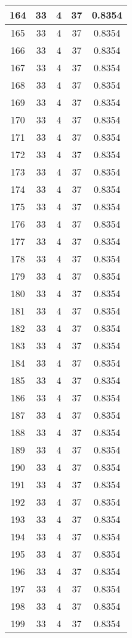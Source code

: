\documentclass[letterpaper, 12pt]{article}
\begin{document}
\begin{longtable}{|c|c|c|c|c|}
\hline
164 & 33 & 4 & 37 & 0.8354 \\
\hline
165 & 33 & 4 & 37 & 0.8354 \\
\hline
166 & 33 & 4 & 37 & 0.8354 \\
\hline
167 & 33 & 4 & 37 & 0.8354 \\
\hline
168 & 33 & 4 & 37 & 0.8354 \\
\hline
169 & 33 & 4 & 37 & 0.8354 \\
\hline
170 & 33 & 4 & 37 & 0.8354 \\
\hline
171 & 33 & 4 & 37 & 0.8354 \\
\hline
172 & 33 & 4 & 37 & 0.8354 \\
\hline
173 & 33 & 4 & 37 & 0.8354 \\
\hline
174 & 33 & 4 & 37 & 0.8354 \\
\hline
175 & 33 & 4 & 37 & 0.8354 \\
\hline
176 & 33 & 4 & 37 & 0.8354 \\
\hline
177 & 33 & 4 & 37 & 0.8354 \\
\hline
178 & 33 & 4 & 37 & 0.8354 \\
\hline
179 & 33 & 4 & 37 & 0.8354 \\
\hline
180 & 33 & 4 & 37 & 0.8354 \\
\hline
181 & 33 & 4 & 37 & 0.8354 \\
\hline
182 & 33 & 4 & 37 & 0.8354 \\
\hline
183 & 33 & 4 & 37 & 0.8354 \\
\hline
184 & 33 & 4 & 37 & 0.8354 \\
\hline
185 & 33 & 4 & 37 & 0.8354 \\
\hline
186 & 33 & 4 & 37 & 0.8354 \\
\hline
187 & 33 & 4 & 37 & 0.8354 \\
\hline
188 & 33 & 4 & 37 & 0.8354 \\
\hline
189 & 33 & 4 & 37 & 0.8354 \\
\hline
190 & 33 & 4 & 37 & 0.8354 \\
\hline
191 & 33 & 4 & 37 & 0.8354 \\
\hline
192 & 33 & 4 & 37 & 0.8354 \\
\hline
193 & 33 & 4 & 37 & 0.8354 \\
\hline
194 & 33 & 4 & 37 & 0.8354 \\
\hline
195 & 33 & 4 & 37 & 0.8354 \\
\hline
196 & 33 & 4 & 37 & 0.8354 \\
\hline
197 & 33 & 4 & 37 & 0.8354 \\
\hline
198 & 33 & 4 & 37 & 0.8354 \\
\hline
199 & 33 & 4 & 37 & 0.8354 \\
\hline
\end{longtable}
\end{document}
